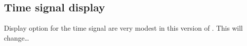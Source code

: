 

\subsection{Time signal display}
\label{sec:displayscalar}

Display option for the time signal are very modest in this version of
\map{}.  This will change\ldots{}



